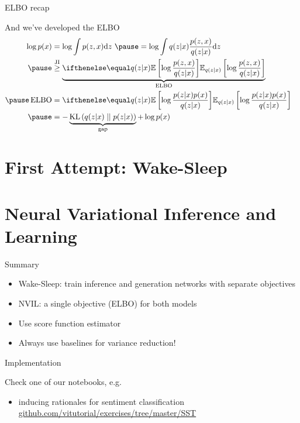 \begin{frame}{ELBO recap}

And we've developed the ELBO
\begin{equation*}
\begin{aligned}
\log p(x) &= \log \int p(z, x) \dd z ~ \pause = \log \int q(z|x) \frac{p(z, x)}{q(z|x)} \dd z \\ \pause
&\overset{\text{JI}}{\ge} \underbrace{\E[q(z|x)]{\log \frac{p(z, x)}{q(z|x)}} }_{\ELBO} %
& \\ \pause
\ELBO &= \E[q(z|x)]{\log \frac{p(z|x)p(x)}{q(z|x)}} \\ \pause
&=-\underbrace{\KL{q(z|x)}{p(z|x)}}_{\text{gap}} + \log p(x)
\end{aligned}
\end{equation*}

\end{frame}


\section{First Attempt: Wake-Sleep}
\frame{\tableofcontents[currentsection]}




\section{Neural Variational Inference and Learning}
\frame{\tableofcontents[currentsection]}



\begin{frame}{Summary}
\begin{itemize}
\item Wake-Sleep: train inference and generation networks with separate objectives
\pause
\item NVIL: a single objective (ELBO) for both models\\ \pause
\item Use score function estimator\\ 
\pause
\item Always use baselines for variance reduction!
\end{itemize}
\end{frame}

\begin{frame}{Implementation}

Check one of our notebooks, e.g.
\begin{itemize}
	\item inducing rationales for sentiment classification \\
\url{github.com/vitutorial/exercises/tree/master/SST}
\end{itemize}


\end{frame}

